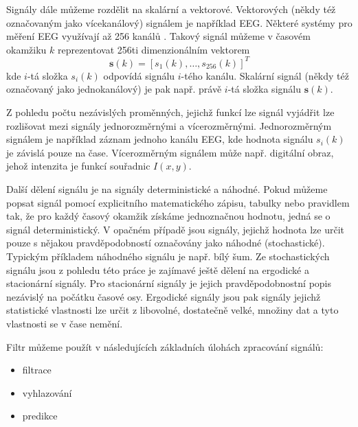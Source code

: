 \par
Signály dále můžeme rozdělit na skalární a vektorové. Vektorových (někdy též označovaným jako vícekanálový) signálem je například EEG. Některé systémy pro měření EEG využívají až 256 kanálů \cite{eeg}. Takový signál můžeme v časovém okamžiku $k$ reprezentovat 256ti dimenzionálním vektorem
\begin{equation}
    \textbf{s}(k)=[s_1(k),\dots,s_{256}(k)]^T
\end{equation}
kde $i$-tá složka $s_i(k)$ odpovídá signálu $i$-tého kanálu. Skalární signál (někdy též označovaný jako jednokanálový) je pak např. právě $i$-tá složka signálu $\textbf{s}(k)$.
\par 
Z pohledu počtu nezávislých proměnných, jejichž funkcí lze signál vyjádřit lze rozlišovat mezi signály jednorozměrnými a vícerozměrnými. Jednorozměrným signálem je například záznam jednoho kanálu EEG, kde hodnota signálu $s_i(k)$ je závislá pouze na čase. Vícerozměrným signálem může např. digitální obraz, jehož intenzita je funkcí souřadnic $I(x,y)$.
\par
Další dělení signálu je na signály deterministické a náhodné. Pokud můžeme popsat signál pomocí explicitního matematického zápisu, tabulky nebo pravidlem tak, že pro každý časový okamžik získáme jednoznačnou hodnotu, jedná se o signál deterministický. V opačném případě jsou signály, jejichž hodnota lze určit pouze s nějakou pravděpodobností označovány jako náhodné (stochastické). Typickým příkladem náhodného signálu je např. bílý šum. Ze stochastických signálu jsou z pohledu této práce je zajímavé ještě dělení na ergodické a stacionární signály. Pro stacionární signály je jejich pravděpodobnostní popis nezávislý na počátku časové osy. Ergodické signály jsou pak signály jejichž statistické vlastnosti lze určit z libovolné, dostatečně velké, množiny dat a tyto vlastnosti se v čase nemění.
\par
Filtr můžeme použít v  následujících základních úlohách zpracování signálů:
\begin{itemize}
    \item filtrace
    \item vyhlazování
    \item predikce
\end{itemize}


